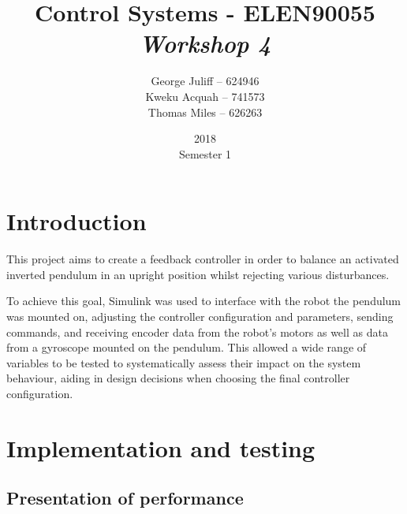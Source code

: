 \documentclass[11pt, a4paper,twocolumn ]{article}
\title{\textbf{Control Systems - ELEN90055} \\ \textit{Workshop 4}}
\date{2018\\ Semester 1}
\author{George Juliff -- 624946\\Kweku Acquah -- 741573\\Thomas Miles -- 626263}
\begin{document}
\maketitle
{}
\clearpage

\section{Introduction}\label{sec:intro}
This project aims to create a feedback controller in order to balance an activated inverted pendulum in an upright position whilst rejecting various disturbances.

To achieve this goal, Simulink was used to interface with the robot the pendulum was mounted on, adjusting the controller configuration and parameters, sending commands, and receiving encoder data from the robot's motors as well as data from a gyroscope mounted on the pendulum. This allowed a wide range of variables to be tested to systematically assess their impact on the system behaviour, aiding in design decisions when choosing the final controller configuration.

    \section{Implementation and testing}\label{sec:test}
        \subsection{Presentation of performance}\label{subsec:performance}
\end{document}
